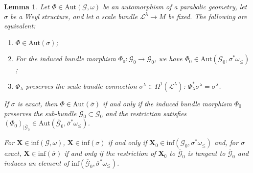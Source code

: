 \documentclass[11pt]{article}
\def\Gbdle{\mathcal{G}}
\theoremstyle{plain}
\newtheorem{Lemma}[Theorem]{Lemma}
\theoremstyle{definition}
\begin{document}
\begin{Lemma} \label{inessential automorphisms TFAE} Let $\Phi \in \mathrm{Aut}(\Gbdle,\omega)$ be an automorphism of a parabolic geometry, let $\sigma$ be a Weyl structure, and let a scale bundle $\mathcal{L}^{\lambda} \rightarrow M$ be fixed. The following are equivalent:
\begin{enumerate}\itemsep=0pt
\item[$(i)$] $\Phi \in \mathrm{Aut}(\sigma)$;
\item[$(ii)$] For the induced bundle morphism $\Phi_0: \Gbdle_0 \rightarrow \Gbdle_0$, we have $\Phi_0 \in \mathrm{Aut}(\Gbdle_0,\sigma^*\omega_{\leq})$;
\item[$(iii)$] $\Phi_{\lambda}$ preserves the scale bundle connection $\sigma^{\lambda} \in \Omega^1(\mathcal{L}^{\lambda})$: $\Phi_{\lambda}^*\sigma^{\lambda} = \sigma^{\lambda}$.
\end{enumerate}

 If $\sigma$ is exact, then $\Phi \in \mathrm{Aut}(\overline{\sigma})$ if and only if the induced bundle morphism $\Phi_0$ preserves the sub-bundle $\overline{\Gbdle}_0 \subset \Gbdle_0$ and the restriction satisfies $(\Phi_0)_{\vert \overline{\Gbdle}_0} \in \mathrm{Aut}(\overline{\Gbdle}_0,\overline{\sigma}^*\omega_{\leq})$.

For $\mathbf{X} \in \mathrm{inf}(\Gbdle,\omega)$, $\mathbf{X} \in \mathrm{inf}(\sigma)$ if and only if $\mathbf{X}_0 \in \mathrm{inf}(\Gbdle_0,\sigma^*\omega_{\leq})$ and, for $\sigma$ exact, $\mathbf{X} \in \mathrm{inf}(\overline{\sigma})$ if and only if the restriction of $\mathbf{X}_0$ to $\overline{\Gbdle}_0$ is tangent to $\overline{\Gbdle}_0$ and induces an element of $\mathrm{inf}(\overline{\Gbdle}_0,\overline{\sigma}^*\omega_{\leq})$.
\end{Lemma}
\end{document}
